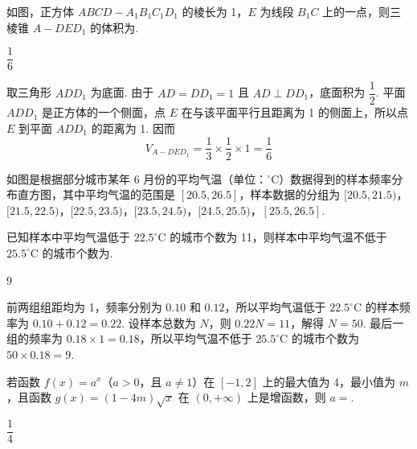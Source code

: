 \begin{problem}
如图，正方体 \(ABCD-A_1B_1C_1D_1\) 的棱长为 1，\(E\) 为线段 \(B_1C\) 上的一点，则三棱锥 \(A-DE D_1\) 的体积为\fillinblank{}.
\end{problem}

\begin{answer}
\(\dfrac16\)
\end{answer}

\begin{solution}
取三角形 \(ADD_1\) 为底面. 由于 \(AD=DD_1=1\) 且 \(AD\perp DD_1\)，底面积为 \(\dfrac12\). 平面 \(ADD_1\) 是正方体的一个侧面，点 \(E\) 在与该平面平行且距离为 1 的侧面上，所以点 \(E\) 到平面 \(ADD_1\) 的距离为 1. 因而
\[
V_{A-DE D_1}=\frac13\times\frac12\times1=\frac16
\]
\end{solution}

\begin{problem}
如图是根据部分城市某年 6 月份的平均气温（单位：\(^{\circ}\mathrm{C}\)）数据得到的样本频率分布直方图，其中平均气温的范围是 \([20.5,26.5]\)，样本数据的分组为 \([20.5,21.5)\)，\([21.5,22.5)\)，\([22.5,23.5)\)，\([23.5,24.5)\)，\([24.5,25.5)\)，\([25.5,26.5]\).

已知样本中平均气温低于 \(22.5^{\circ}\mathrm{C}\) 的城市个数为 11，则样本中平均气温不低于 \(25.5^{\circ}\mathrm{C}\) 的城市个数为\fillinblank{}.

\end{problem}

\begin{answer}
\(9\)
\end{answer}

\begin{solution}
前两组组距均为 1，频率分别为 \(0.10\) 和 \(0.12\)，所以平均气温低于 \(22.5^{\circ}\mathrm{C}\) 的样本频率为 \(0.10+0.12=0.22\). 设样本总数为 \(N\)，则 \(0.22N=11\)，解得 \(N=50\). 最后一组的频率为 \(0.18\times1=0.18\)，所以平均气温不低于 \(25.5^{\circ}\mathrm{C}\) 的城市个数为 \(50\times0.18=9\).
\end{solution}

\begin{problem}
若函数 \(f(x)=a^x\)（\(a>0\)，且 \(a\neq1\)）在 \([-1,2]\) 上的最大值为 4，最小值为 \(m\)，且函数 \(g(x)=(1-4m)\sqrt{x}\) 在 \((0,+\infty)\) 上是增函数，则 \(a=\)\fillinblank{}.
\end{problem}

\begin{answer}
\(\dfrac14\)
\end{answer}

